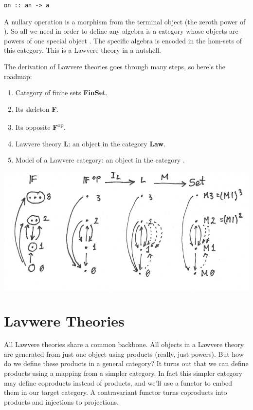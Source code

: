 \begin{verbatim}
αn :: an -> a
\end{verbatim}

A nullary operation is a morphism from the terminal object (the zeroth
power of ). So all we need in order to define any algebra is a
category whose objects are powers of one special object . The
specific algebra is encoded in the hom-sets of this category. This is a
Lawvere theory in a nutshell.

The derivation of Lawvere theories goes through many steps, so here's
the roadmap:

\begin{enumerate}
\tightlist
\item
  Category of finite sets \textbf{FinSet}.
\item
  Its skeleton \textbf{F}.
\item
  Its opposite \textbf{F}\textsuperscript{op}.
\item
  Lawvere theory \textbf{L}: an object in the category \textbf{Law}.
\item
  Model  of a Lawvere category: an object in the category
  .
\end{enumerate}

\includegraphics[width=5.31250in]{images/lawvere1.png}

\section{Lavwere Theories}\label{lavwere-theories}

All Lawvere theories share a common backbone. All objects in a Lawvere
theory are generated from just one object using products (really, just
powers). But how do we define these products in a general category? It
turns out that we can define products using a mapping from a simpler
category. In fact this simpler category may define coproducts instead of
products, and we'll use a  functor to embed them in
our target category. A contravariant functor turns coproducts into
products and injections to projections.

